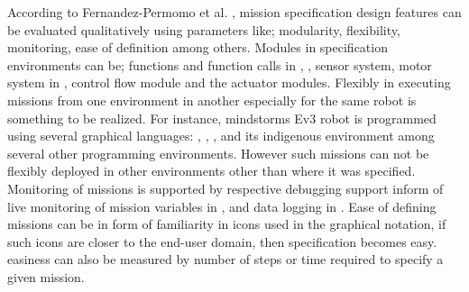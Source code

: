 
According to Fernandez-Permomo et al. \cite{Fernandez-Perdomo2010}, mission specification design features can be evaluated qualitatively using parameters like; modularity, flexibility, monitoring, ease of definition among others. Modules in specification environments can be; functions and function calls in \ardublockly, \openroberta, sensor system, motor system in \picaxe, control flow module and the actuator modules.   Flexibly in executing missions from one environment in another especially for the same robot is something to be realized. For instance, mindstorms Ev3 robot is programmed using several graphical languages: \trik, \openroberta, \robotc, \scratchev and its indigenous environment \lego among several other programming environments. However such missions can not be flexibly deployed in other environments other than where it was specified. Monitoring of missions is supported by respective debugging support inform of live monitoring of mission variables in \edison, \aseba and data logging in \codelab. Ease of defining missions can be in form of familiarity in icons used in the graphical notation, if such icons are closer to the end-user domain, then specification becomes easy. easiness can also be measured by number of steps or time required to specify a given mission.
